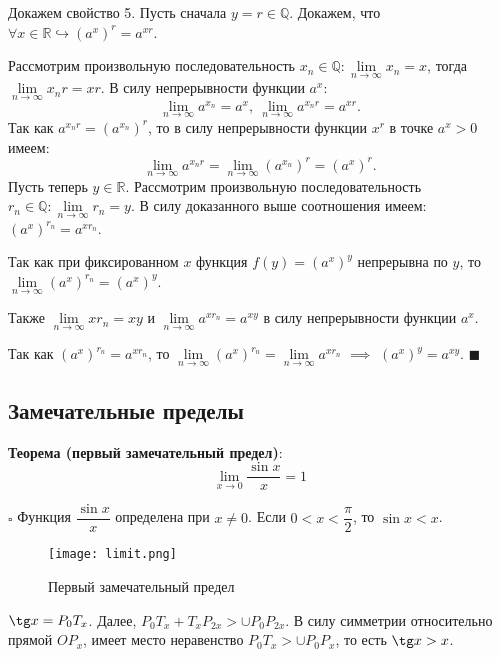 \documentclass[12pt, a4paper, reqno]{article}
\begin{document}
    Докажем свойство 5.
    Пусть сначала $y = r\in\mathbb{Q}$. Докажем, что $\forall x\in\mathbb{R}\hookrightarrow (a^x)^r
    = a^{xr}$.

    Рассмотрим произвольную последовательность $x_n\in\mathbb{Q}: \lim\limits_{n\to\infty} x_n = x$,
    тогда $\lim\limits_{n\to\infty} x_nr = xr$. В силу непрерывности функции $a^x$:
    \begin{equation*}
        \lim\limits_{n\to\infty} a^{x_n} = a^x,\ \lim\limits_{n\to\infty} a^{x_nr} = a^{xr}.
    \end{equation*}
    Так как $a^{x_nr} = (a^{x_n})^r$, то в силу непрерывности функции $x^r$ в точке $a^x > 0$ имеем:
    \begin{equation*}
        \lim\limits_{n\to\infty} a^{x_nr} = \lim\limits_{n\to\infty} (a^{x_n})^r = (a^x)^r.
    \end{equation*}
    Пусть теперь $y\in\mathbb{R}$. Рассмотрим произвольную последовательность $r_n\in\mathbb{Q}:
    \lim\limits_{n\to\infty} r_n = y$. В силу доказанного выше соотношения имеем: $(a^x)^{r_n} =
    a^{xr_n}$.

    Так как при фиксированном $x$ функция $f(y) = (a^x)^y$ непрерывна по $y$, то
    $\lim\limits_{n\to\infty} (a^x)^{r_n} = (a^x)^y$.

    Также $\lim\limits_{n\to\infty} xr_n = xy$ и $\lim\limits_{n\to\infty} a^{xr_n} = a^{xy}$ в силу
    непрерывности функции $a^x$.

    Так как $(a^x)^{r_n} = a^{xr_n}$, то $\lim\limits_{n\to\infty} (a^x)^{r_n} =
    \lim\limits_{n\to\infty} a^{xr_n}$ $\implies$ $(a^x)^y = a^{xy}$. $\blacksquare$

\subsection{Замечательные пределы}

    \textbf{Теорема (первый замечательный предел)}:
    \begin{equation*}
        \lim\limits_{x\to 0} \dfrac{\sin{x}}{x} = 1
    \end{equation*}

    $\square$ Функция $\dfrac{\sin{x}}{x}$ определена при $x\neq 0$. Если $0 < x < \dfrac{\pi}{2}$,
    то $\sin{x} < x$.
    \begin{figure}[H]
        \centering
        \texttt{[image: limit.png]}
        \caption{Первый замечательный предел}
    \end{figure}
    $\tg x = P_0T_x$. Далее, $P_0T_x + T_xP_{2x} > \cup P_0P_{2x}$. В силу симметрии относительно
    прямой $OP_x$, имеет место неравенство $P_0T_x > \cup P_0P_x$, то есть $\tg x > x$.
\end{document}
